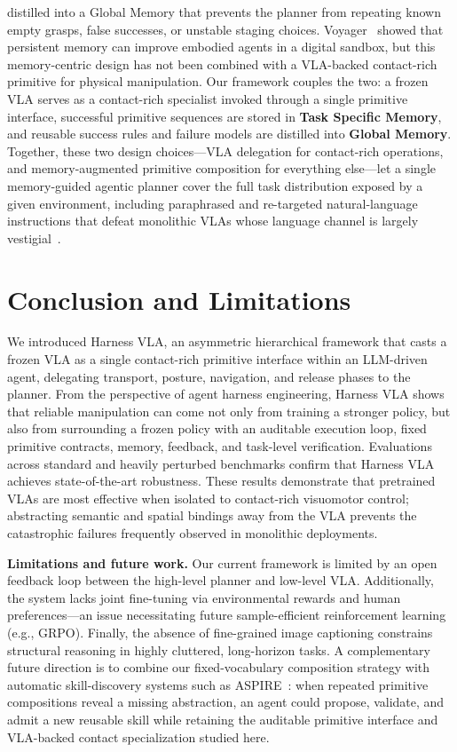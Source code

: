 \documentclass[11pt]{article}
\begin{document}
distilled into a Global Memory that prevents the planner from repeating known empty grasps, false successes, or unstable staging choices. Voyager~\citep{wang2023voyager} showed that persistent memory can improve embodied agents in a digital sandbox, but this memory-centric design has not been combined with a VLA-backed contact-rich primitive for physical manipulation. Our framework couples the two: a frozen VLA serves as a contact-rich specialist invoked through a single primitive interface, successful primitive sequences are stored in \textbf{Task Specific Memory}, and reusable success rules and failure models are distilled into \textbf{Global Memory}. Together, these two design choices---VLA delegation for contact-rich operations, and memory-augmented primitive composition for everything else---let a single memory-guided agentic planner cover the full task distribution exposed by a given environment, including paraphrased and re-targeted natural-language instructions that defeat monolithic VLAs whose language channel is largely vestigial~\citep{kim2024openvla, black2025pi05}.

\section{Conclusion and Limitations}
\label{sec:conclusion}

We introduced Harness VLA, an asymmetric hierarchical framework that casts a frozen VLA as a single contact-rich primitive interface within an LLM-driven agent, delegating transport, posture, navigation, and release phases to the planner. From the perspective of agent harness engineering, Harness VLA shows that reliable manipulation can come not only from training a stronger policy, but also from surrounding a frozen policy with an auditable execution loop, fixed primitive contracts, memory, feedback, and task-level verification. Evaluations across standard and heavily perturbed benchmarks confirm that Harness VLA achieves state-of-the-art robustness. These results demonstrate that pretrained VLAs are most effective when isolated to contact-rich visuomotor control; abstracting semantic and spatial bindings away from the VLA prevents the catastrophic failures frequently observed in monolithic deployments.

\textbf{Limitations and future work.} Our current framework is limited by an open feedback loop between the high-level planner and low-level VLA. Additionally, the system lacks joint fine-tuning via environmental rewards and human preferences---an issue necessitating future sample-efficient reinforcement learning (e.g., GRPO). Finally, the absence of fine-grained image captioning constrains structural reasoning in highly cluttered, long-horizon tasks. A complementary future direction is to combine our fixed-vocabulary composition strategy with automatic skill-discovery systems such as ASPIRE~\citep{lu2026aspire}: when repeated primitive compositions reveal a missing abstraction, an agent could propose, validate, and admit a new reusable skill while retaining the auditable primitive interface and VLA-backed contact specialization studied here.
\end{document}
